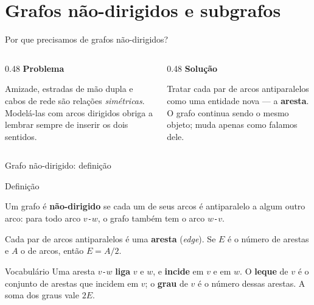\documentclass[aspectratio=169]{beamer}
\begin{document}
\section{Grafos não-dirigidos e subgrafos}

\begin{frame}{Por que precisamos de grafos não-dirigidos?}
  \begin{columns}[T]
    \begin{column}{0.48\textwidth}
      \textbf{Problema}

      \medskip
      {\small Amizade, estradas de mão dupla e cabos de rede são relações
      \emph{simétricas}. Modelá-las com arcos dirigidos obriga a lembrar sempre
      de inserir os dois sentidos.}
    \end{column}
    \begin{column}{0.48\textwidth}
      \textbf{Solução}

      \medskip
      {\small Tratar cada par de arcos antiparalelos como uma entidade nova ---
      a \textbf{aresta}. O grafo continua sendo o mesmo objeto; muda apenas
      como falamos dele.}
    \end{column}
  \end{columns}
\end{frame}

\begin{frame}{Grafo não-dirigido: definição}
  \begin{block}{Definição}
    {\small Um grafo é \textbf{não-dirigido} se cada um de seus arcos é
    antiparalelo a algum outro arco: para todo arco $v$\texttt{-}$w$, o grafo
    também tem o arco $w$\texttt{-}$v$.

    \smallskip
    Cada par de arcos antiparalelos é uma \textbf{aresta} (\emph{edge}).
    Se $E$ é o número de arestas e $A$ o de arcos, então $E = A/2$.}
  \end{block}
  \begin{exampleblock}{Vocabulário}
    {\small Uma aresta $v$\texttt{-}$w$ \textbf{liga} $v$ e $w$, e
    \textbf{incide} em $v$ e em $w$. O \textbf{leque} de $v$ é o conjunto de
    arestas que incidem em $v$; o \textbf{grau} de $v$ é o número dessas
    arestas. A soma dos graus vale $2E$.}
  \end{exampleblock}
\end{frame}
\end{document}
